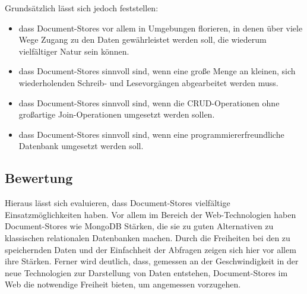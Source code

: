 Grundsätzlich lässt sich jedoch feststellen:
\begin{itemize}
\item dass Document-Stores vor allem in Umgebungen florieren, in denen über viele Wege Zugang zu den Daten gewährleistet werden soll, die wiederum vielfältiger Natur sein können. 
\item dass Document-Stores sinnvoll sind, wenn eine große Menge an kleinen, sich wiederholenden Schreib- und Lesevorgängen abgearbeitet werden muss.
\item dass Document-Stores sinnvoll sind, wenn die CRUD-Operationen ohne großartige Join-Operationen umgesetzt werden sollen.
\item dass Document-Stores sinnvoll sind, wenn eine programmiererfreundliche Datenbank umgesetzt werden soll.
\end{itemize}

\subsection{Bewertung}
Hieraus lässt sich evaluieren, dass Document-Stores vielfältige Einsatzmöglichkeiten haben. Vor allem im Bereich der Web-Technologien haben Document-Stores wie MongoDB Stärken, die sie zu guten Alternativen zu klassischen relationalen Datenbanken machen. Durch die Freiheiten bei den zu speichernden Daten und der Einfachheit der Abfragen zeigen sich hier vor allem ihre Stärken. Ferner wird deutlich, dass, gemessen an der Geschwindigkeit in der neue Technologien zur Darstellung von Daten entstehen, Document-Stores im Web die notwendige Freiheit bieten, um angemessen vorzugehen.